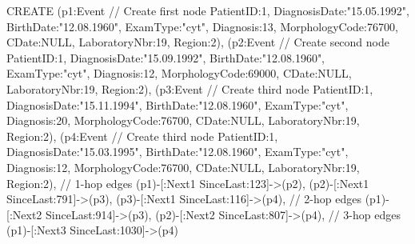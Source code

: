 CREATE 
(p1:Event // Create first node
	{PatientID:1, DiagnosisDate:"15.05.1992", BirthDate:"12.08.1960", ExamType:"cyt", 
	 Diagnosis:13, MorphologyCode:76700, CDate:NULL, LaboratoryNbr:19, Region:2}),
(p2:Event // Create second node
	{PatientID:1, DiagnosisDate:"15.09.1992", BirthDate:"12.08.1960", ExamType:"cyt", 
	Diagnosis:12, MorphologyCode:69000, CDate:NULL, LaboratoryNbr:19, Region:2}),
(p3:Event // Create third node
	{PatientID:1, DiagnosisDate:"15.11.1994", BirthDate:"12.08.1960", ExamType:"cyt", 
	Diagnosis:20, MorphologyCode:76700, CDate:NULL, LaboratoryNbr:19, Region:2}),
(p4:Event // Create third node
	{PatientID:1, DiagnosisDate:"15.03.1995", BirthDate:"12.08.1960", ExamType:"cyt", 
	Diagnosis:12, MorphologyCode:76700, CDate:NULL, LaboratoryNbr:19, Region:2}),
// 1-hop edges
(p1)-[:Next1 {SinceLast:123}]->(p2),
(p2)-[:Next1 {SinceLast:791}]->(p3),
(p3)-[:Next1 {SinceLast:116}]->(p4), 
// 2-hop edges
(p1)-[:Next2 {SinceLast:914}]->(p3), (p2)-[:Next2 {SinceLast:807}]->(p4),
// 3-hop edges
(p1)-[:Next3 {SinceLast:1030}]->(p4)